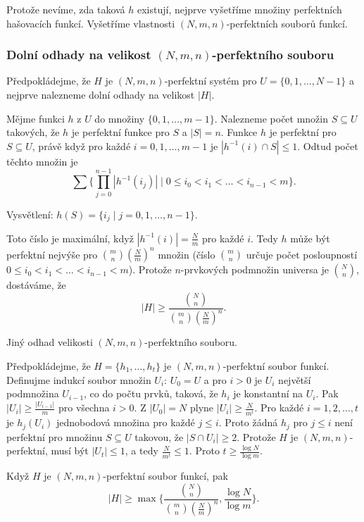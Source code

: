 \documentclass[a4paper,12pt]{article}
\begin{document}
Protože nevíme, zda taková $h$ existují, nejprve 
vyšetříme mno\-ži\-ny perfektních hašovacích 
funkcí. Vyšetříme vlastnosti $(N,m,n)$-perfektních 
souborů funkcí.

\subsubsection{Dolní odhady na velikost $(N,m,n)$-perfektního souboru}

Předpokládejme, že $H$  je $(N,m,n)$-perfektní 
systém pro $U=\{0,1,\dots,N-1\}$ a nejprve nalezneme dolní 
odhady na velikost $|H|$.

Mějme funkci $h$ z $U$ do množiny $\{0,1,\dots,m-
1\}$. 
Nalezneme počet množin $S\subseteq U$ takových, že  
$h$ je perfektní funkce pro $S$ a $|S|=n$. Funkce $h$ je perfektní pro 
$S\subseteq U$, právě když pro každé $i=0,1,\dots,m-
1$ je 
$|h^{-1}(i)\cap S|\le 1$. Odtud počet těchto množin je
$$\sum \{\prod_{j=0}^{n-1}|h^{-1}(i_j)|\mid 0\le i_0<i_1<\dots<i_{
n-1}<m\}.$$

Vysvětlení: $h(S)=\{i_j\mid j=0,1,\dots,n-1\}$.

Toto číslo je maximální, když $|h^{-1}(
i)|=\frac Nm$ pro každé $i$. 
Tedy $h$ může být perfektní nejvýše pro $\binom 
mn(\frac Nm)^n$ 
množin (číslo $\binom mn$ určuje počet posloupností 
$0\le i_0<i_1<\dots<i_{n-1}<m$). Protože $n$-prvkových 
podmnožin universa je $\binom Nn$, dostáváme, že 
$$|H|\ge\frac {\binom Nn}{\binom mn(\frac Nm)^n}.$$

Jiný odhad velikosti $(N,m,n)$-perfektního souboru.

Předpokládejme, že $H=\{h_1,\dots,h_t\}$ je 
$(N,m,n)$-perfektní soubor funkcí.  Definujme indukcí 
soubor množin $U_i$:\newline 
$U_0=U$ a pro 
$i>0$ je $U_i$ největší podmnožina $U_{i-1}$, co do počtu 
prvků, 
taková, že $h_i$ je konstantní na $U_i$.  Pak $|U_i|\ge\frac {
|U_{i-1}|}m$ 
pro všechna $i>0$.  Z $|U_0|=N$ plyne $|U_i|\ge\frac N{m^i}$.  Pro každé 
$i=1,2,\dots,t$ je $h_j(U_i)$ jednobodová množina pro každé 
$j\le i$.  Proto žádná $h_j$ pro $j\le i$ není perfektní pro 
množinu $S\subseteq U$ takovou, že $|S\cap U_i|\ge 2$.  Protože $
H$ je 
$(N,m,n)$-perfektní, musí být $|U_t|\le 1$, a tedy $\frac 
N{m^t}\le 1$.  Proto 
$t\ge\frac {\log N}{\log m}$.    

\begin{veta}Když $H$ je $(N,m,n)$-perfektní soubor 
funkcí, pak 
$$|H|\ge\max\{\frac {\binom Nn}{\binom mn(\frac Nm)^n},\frac {\log 
N}{\log m}\}.$$
\end{veta}
\end{document}
